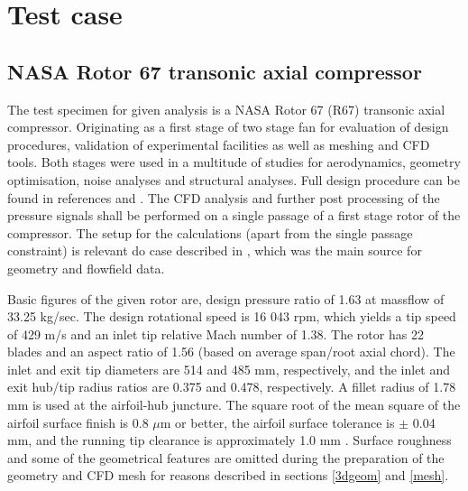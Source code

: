 
\chapter{Test case} %

\label{case} %


\section{NASA Rotor 67 transonic axial compressor}

The test specimen for given analysis is a NASA Rotor 67 (R67) transonic axial compressor. Originating as a first stage of two stage fan for evaluation of design procedures, validation of experimental facilities as well as meshing and CFD tools. Both stages were used in a multitude of studies for aerodynamics, geometry optimisation, noise analyses and structural analyses. Full design procedure can be found in references \cite{r67design} and \citep{r67performance}. The CFD analysis and further post processing of the pressure signals shall be performed on a single passage of a first stage rotor of the compressor. The setup for the  calculations (apart from the single passage constraint) is relevant do case described in \citep{r67laser}, which was the main source for geometry and flowfield data.

Basic figures of the given rotor are, design pressure ratio of 1.63 at massflow of 33.25 kg/sec. The design rotational speed is 16 043 rpm, which yields a tip speed of 429 m/s and an inlet tip relative Mach number of 1.38. The rotor has 22 blades and an aspect ratio of 1.56 (based on average span/root axial chord). The inlet and exit tip diameters are 514 and 485 mm, respectively, and the inlet and exit hub/tip radius ratios are 0.375 and 0.478, respectively. A fillet radius of 1.78 mm is used at the airfoil-hub juncture. The square root of the mean square of the airfoil surface finish is 0.8 $\mu${}m or better, the airfoil surface tolerance is $\pm$ 0.04 mm, and the running tip clearance is approximately 1.0 mm \citep{r67laser}. Surface roughness and some of the geometrical features are omitted during the preparation of the geometry and CFD mesh for reasons described in sections \ref{3dgeom} and \ref{mesh}. 


